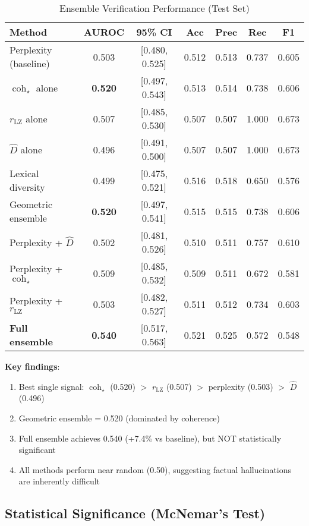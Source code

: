 \documentclass[11pt]{article}
\begin{document}
\begin{table}[h]
\centering
\caption{Ensemble Verification Performance (Test Set)}
\label{tab:performance}
\small
\begin{tabular}{lcccccc}
\toprule
\textbf{Method} & \textbf{AUROC} & \textbf{95\% CI} & \textbf{Acc} & \textbf{Prec} & \textbf{Rec} & \textbf{F1} \\
\midrule
Perplexity (baseline) & 0.503 & [0.480, 0.525] & 0.512 & 0.513 & 0.737 & 0.605 \\
$\operatorname{coh}_\star$ alone & \textbf{0.520} & [0.497, 0.543] & 0.513 & 0.514 & 0.738 & 0.606 \\
$r_{\text{LZ}}$ alone & 0.507 & [0.485, 0.530] & 0.507 & 0.507 & 1.000 & 0.673 \\
$\hat{D}$ alone & 0.496 & [0.491, 0.500] & 0.507 & 0.507 & 1.000 & 0.673 \\
Lexical diversity & 0.499 & [0.475, 0.521] & 0.516 & 0.518 & 0.650 & 0.576 \\
Geometric ensemble & \textbf{0.520} & [0.497, 0.541] & 0.515 & 0.515 & 0.738 & 0.606 \\
Perplexity + $\hat{D}$ & 0.502 & [0.481, 0.526] & 0.510 & 0.511 & 0.757 & 0.610 \\
Perplexity + $\operatorname{coh}_\star$ & 0.509 & [0.485, 0.532] & 0.509 & 0.511 & 0.672 & 0.581 \\
Perplexity + $r_{\text{LZ}}$ & 0.503 & [0.482, 0.527] & 0.511 & 0.512 & 0.734 & 0.603 \\
\textbf{Full ensemble} & \textbf{0.540} & [0.517, 0.563] & 0.521 & 0.525 & 0.572 & 0.548 \\
\bottomrule
\end{tabular}
\end{table}

\textbf{Key findings}:
\begin{enumerate}
\item Best single signal: $\operatorname{coh}_\star$ (0.520) $>$ $r_{\text{LZ}}$ (0.507) $>$ perplexity (0.503) $>$ $\hat{D}$ (0.496)
\item Geometric ensemble = 0.520 (dominated by coherence)
\item Full ensemble achieves 0.540 (+7.4\% vs baseline), but NOT statistically significant
\item All methods perform near random (0.50), suggesting factual hallucinations are inherently difficult
\end{enumerate}

\subsection{Statistical Significance (McNemar's Test)}
\end{document}

